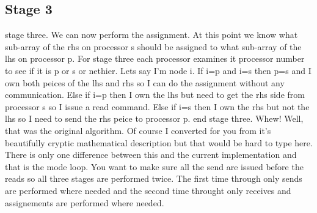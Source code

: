 \subsection*{Stage 3}
stage three.  We can now perform the assignment.  At this point
we know what sub-array of the rhs on processor s should be assigned to
what sub-array of the lhs on processor p.  For stage three each processor
examines it processor number to see if it is p or s or nethier.   Lets
say I'm node i.  If i=p and i=s then p=s and I own both peices of the
lhs and rhs so I can do the assignment without any communication.  Else
if i=p then I own the lhs but need to get the rhs side from processor s
so I issue a read command.  Else if i=s then I own the rhs but not the
lhs so I need to send the rhs peice to processor p.
end stage three.
Whew!
Well, that was the original algorithm.  Of course I converted for
you from it's beautifully cryptic mathematical description 
but that would be hard to type here.  There is
only one difference between this and the current implementation and
that is the mode loop.  You want to make sure all the send are issued
before the reads so all three stages are performed twice.  The first
time through only sends are performed where needed and the second time
throught only receives and assignements are performed where needed.
